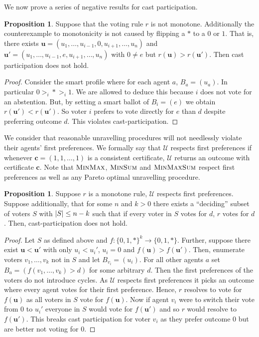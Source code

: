 \documentclass[11pt,a4paper, titlepage]{article}
\DeclarePairedDelimiter\abs{\lvert}{\rvert}
\theoremstyle{definition}
\newtheorem{proposition}[theorem]{Proposition}
\let\vec\mathbf
\begin{document}
We now prove a series of negative results for cast participation.



\begin{proposition} Suppose that the voting rule $r$ is not monotone. Additionally the counterexample to monotonicity is not caused by flipping a $*$ to a $0$ or $1$. 
That is, there exists $\vec{u} = (u_1, \ldots, u_{i-1}, 0, u_{i+1}, \ldots, u_n)$ and $\vec{u}' = (u_1, \ldots, u_{i-1}, e, u_{i+1}, \ldots, u_n)$ with $0 \neq e$ but $r(\vec{u}) > r(\vec{u}')$. 
Then cast participation does not hold.
\end{proposition}

\begin{proof}
    Consider the smart profile where for each agent $a$, $B_a = (u_a)$. 
    In particular $0 >_i * >_i 1$. We are allowed to deduce this because $i$ does not vote for an abstention.
    But, by setting a smart ballot of $B_i = (e)$ we obtain $r(\vec{u}') < r(\vec{u}')$. So voter $i$ prefers to vote directly for $e$ than $d$ despite preferring outcome $d$.
    This violates cast-participation.
\end{proof}

We consider that reasonable unravelling procedures will not needlessly violate their agents' first preferences. 
We formally say that $\mathcal{U}$ respects first preferences if whenever $\vec{c} = (1, 1, \ldots, 1)$ is a consistent certificate, $\mathcal{U}$ returns an outcome with certificate $\vec{c}$. 
Note that $\textsc{MinMax}$, $\textsc{MinSum}$ and $\textsc{MinMaxSum}$ respect first preferences as well as any Pareto optimal unravelling procedure.

\begin{proposition}
    Suppose $r$ is a monotone rule, $\mathcal{U}$ respects first preferences. Suppose additionally, that for some $n$ and $k > 0$ there exists a ``deciding'' subset of voters $S$ with $\abs{S} \leq n - k$ such that if every voter in $S$ votes for $d$, $r$ votes for $d$.
    Then, cast-participation does not hold.
\end{proposition}

\begin{proof}
    Let $S$ as defined above and $f: \{0, 1, *\}^k \longrightarrow \{0,1, *\}$.
    Further, suppose there exist $\vec{u} < \vec{u}'$ with only $u_i < u_i'$, $u_i = 0$ and $f(\vec{u}) > f(\vec{u}')$. Then, enumerate voters $v_1, \ldots, v_k$ not in $S$ and let $B_{v_i} = (u_i)$. 
    For all other agents $a$ set $B_{a} = (f(v_1, \ldots, v_k) > d)$ for some arbitrary $d$. 
    Then the first preferences of the voters do not introduce cycles. 
    As $\mathcal{U}$ respects first preferences it picks an outcome where every agent votes for their first preference.
    Hence, $r$ resolves to vote for $f(\vec{u})$ as all voters in $S$ vote for $f(\vec{u})$.
    Now if agent $v_i$ were to switch their vote from $0$ to $u_i'$ everyone in $S$ would vote for $f(\vec{u}')$ and so $r$ would resolve to $f(\vec{u}')$. This breaks cast participation for voter $v_i$ as they prefer outcome 0 but are better not voting for 0.
\end{proof}
\end{document}
